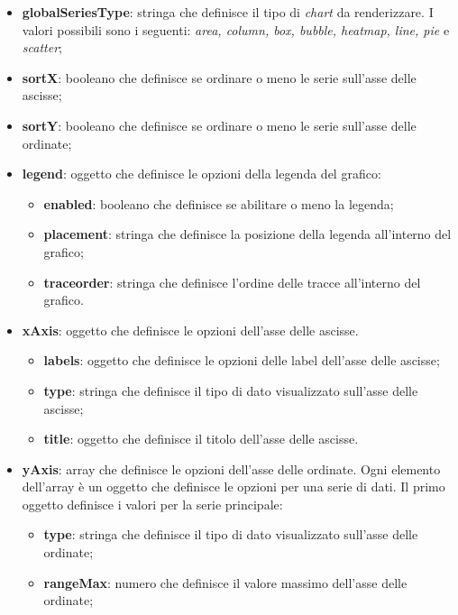 \begin{itemize}
      \item \textbf{globalSeriesType}: stringa che definisce il tipo di \textit{chart} da renderizzare. I valori possibili sono i seguenti:
            \textit{area, column, box, bubble, heatmap, line, pie} e \textit{scatter};
      \item \textbf{sortX}: booleano che definisce se ordinare o meno le serie sull'asse delle ascisse;
      \item \textbf{sortY}: booleano che definisce se ordinare o meno le serie sull'asse delle ordinate;
      \item \textbf{legend}: oggetto che definisce le opzioni della legenda del grafico:
            \begin{itemize}
                  \item \textbf{enabled}: booleano che definisce se abilitare o meno la legenda;
                  \item \textbf{placement}: stringa che definisce la posizione della legenda all'interno del grafico;
                  \item \textbf{traceorder}: stringa che definisce l'ordine delle tracce all'interno del grafico.
            \end{itemize}
      \item \textbf{xAxis}: oggetto che definisce le opzioni dell'asse delle ascisse.
            \begin{itemize}
                  \item \textbf{labels}: oggetto che definisce le opzioni delle label dell'asse delle ascisse;
                  \item \textbf{type}: stringa che definisce il tipo di dato visualizzato sull'asse delle ascisse;
                  \item \textbf{title}: oggetto che definisce il titolo dell'asse delle ascisse.
            \end{itemize}
      \item \textbf{yAxis}: array che definisce le opzioni dell'asse delle ordinate. Ogni elemento dell'array è un oggetto che definisce le opzioni per una serie di dati. \newline
            Il primo oggetto definisce i valori per la serie principale:
            \begin{itemize}
                  \item \textbf{type}: stringa che definisce il tipo di dato visualizzato sull'asse delle ordinate;
                  \item \textbf{rangeMax}: numero che definisce il valore massimo dell'asse delle ordinate;

\end{itemize}
\end{itemize}
